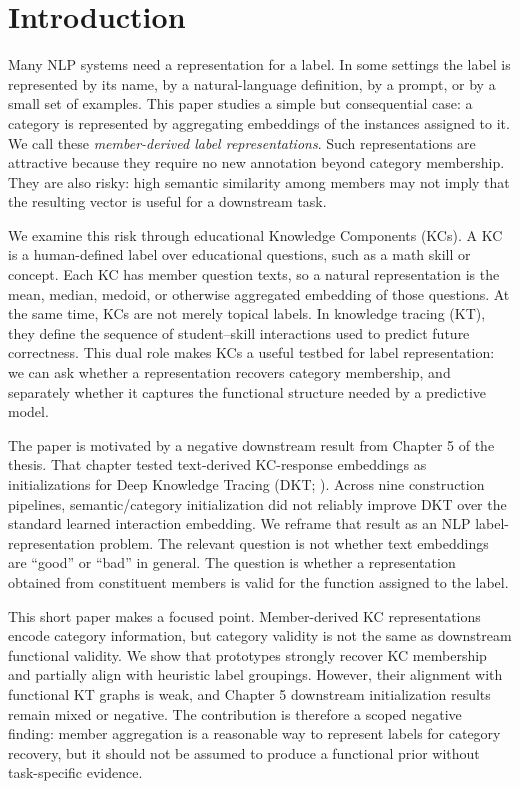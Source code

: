 \section{Introduction}
Many NLP systems need a representation for a label. In some settings the label is represented by its name, by a natural-language definition, by a prompt, or by a small set of examples. This paper studies a simple but consequential case: a category is represented by aggregating embeddings of the instances assigned to it. We call these \emph{member-derived label representations}. Such representations are attractive because they require no new annotation beyond category membership. They are also risky: high semantic similarity among members may not imply that the resulting vector is useful for a downstream task.

We examine this risk through educational Knowledge Components (KCs). A KC is a human-defined label over educational questions, such as a math skill or concept. Each KC has member question texts, so a natural representation is the mean, median, medoid, or otherwise aggregated embedding of those questions. At the same time, KCs are not merely topical labels. In knowledge tracing (KT), they define the sequence of student--skill interactions used to predict future correctness. This dual role makes KCs a useful testbed for label representation: we can ask whether a representation recovers category membership, and separately whether it captures the functional structure needed by a predictive model.

The paper is motivated by a negative downstream result from Chapter 5 of the thesis. That chapter tested text-derived KC-response embeddings as initializations for Deep Knowledge Tracing (DKT; \citealp{piech2015dkt}). Across nine construction pipelines, semantic/category initialization did not reliably improve DKT over the standard learned interaction embedding. We reframe that result as an NLP label-representation problem. The relevant question is not whether text embeddings are ``good'' or ``bad'' in general. The question is whether a representation obtained from constituent members is valid for the function assigned to the label.

This short paper makes a focused point. Member-derived KC representations encode category information, but category validity is not the same as downstream functional validity. We show that prototypes strongly recover KC membership and partially align with heuristic label groupings. However, their alignment with functional KT graphs is weak, and Chapter 5 downstream initialization results remain mixed or negative. The contribution is therefore a scoped negative finding: member aggregation is a reasonable way to represent labels for category recovery, but it should not be assumed to produce a functional prior without task-specific evidence.

